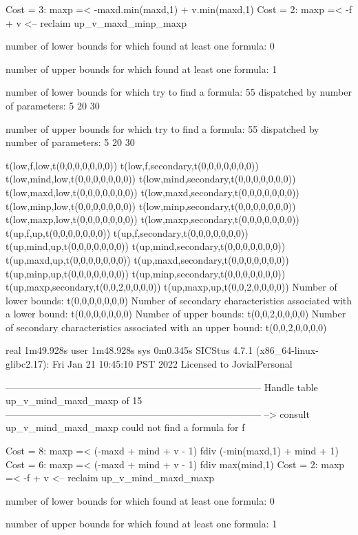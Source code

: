 Cost =  3:  maxp =< -maxd.min(maxd,1) + v.min(maxd,1)
Cost =  2:  maxp =< -f + v
<-- reclaim up_v_maxd_minp_maxp

number of lower bounds for which found at least one formula: 0

number of upper bounds for which found at least one formula: 1

number of lower bounds for which try to find a formula: 55
dispatched by number of parameters: 5  20  30

number of upper bounds for which try to find a formula: 55
dispatched by number of parameters: 5  20  30

t(low,f,low,t(0,0,0,0,0,0,0))
t(low,f,secondary,t(0,0,0,0,0,0,0))
t(low,mind,low,t(0,0,0,0,0,0,0))
t(low,mind,secondary,t(0,0,0,0,0,0,0))
t(low,maxd,low,t(0,0,0,0,0,0,0))
t(low,maxd,secondary,t(0,0,0,0,0,0,0))
t(low,minp,low,t(0,0,0,0,0,0,0))
t(low,minp,secondary,t(0,0,0,0,0,0,0))
t(low,maxp,low,t(0,0,0,0,0,0,0))
t(low,maxp,secondary,t(0,0,0,0,0,0,0))
t(up,f,up,t(0,0,0,0,0,0,0))
t(up,f,secondary,t(0,0,0,0,0,0,0))
t(up,mind,up,t(0,0,0,0,0,0,0))
t(up,mind,secondary,t(0,0,0,0,0,0,0))
t(up,maxd,up,t(0,0,0,0,0,0,0))
t(up,maxd,secondary,t(0,0,0,0,0,0,0))
t(up,minp,up,t(0,0,0,0,0,0,0))
t(up,minp,secondary,t(0,0,0,0,0,0,0))
t(up,maxp,secondary,t(0,0,2,0,0,0,0))
t(up,maxp,up,t(0,0,2,0,0,0,0))
Number of lower bounds:                                             t(0,0,0,0,0,0,0)
Number of secondary characteristics associated with a lower bound:  t(0,0,0,0,0,0,0)
Number of upper bounds:                                             t(0,0,2,0,0,0,0)
Number of secondary characteristics associated with an upper bound: t(0,0,2,0,0,0,0)

real	1m49.928s
user	1m48.928s
sys	0m0.345s
SICStus 4.7.1 (x86_64-linux-glibc2.17): Fri Jan 21 10:45:10 PST 2022
Licensed to JovialPersonal


--------------------------------------------------------------------------------
Handle table up_v_mind_maxd_maxp of 15
--------------------------------------------------------------------------------
--> consult up_v_mind_maxd_maxp
could not find a formula for f

Cost =  8:  maxp =< (-maxd + mind + v - 1) fdiv (-min(maxd,1) + mind + 1)
Cost =  6:  maxp =< (-maxd + mind + v - 1) fdiv max(mind,1)
Cost =  2:  maxp =< -f + v
<-- reclaim up_v_mind_maxd_maxp

number of lower bounds for which found at least one formula: 0

number of upper bounds for which found at least one formula: 1


